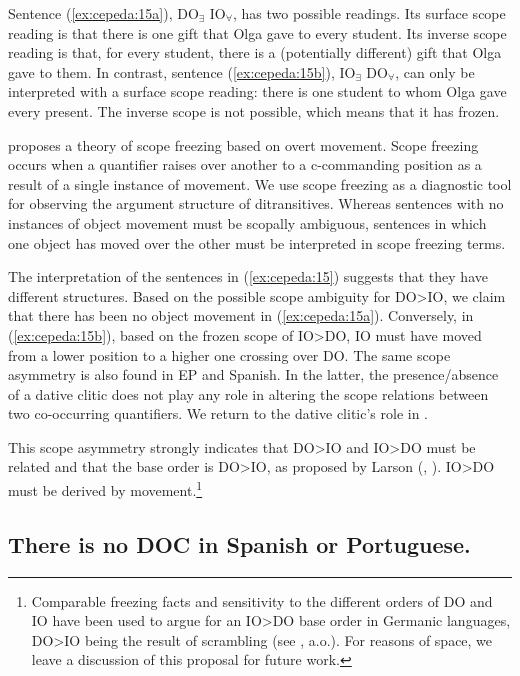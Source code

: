 \documentclass[output=paper,colorlinks,citecolor=brown,nonflat]{./langscibook}
\begin{document}
Sentence (\ref{ex:cepeda:15a}), DO$_∃$ IO$_∀$, has two possible readings. Its surface scope reading is that there is one gift that Olga gave to every student. Its inverse scope reading is that, for every student, there is a (potentially different) gift that Olga gave to them. In contrast, sentence (\ref{ex:cepeda:15b}), IO$_∃$  DO$_∀$, can only be interpreted with a surface scope reading: there is one student to whom Olga gave every present. The inverse scope is not possible, which means that it has frozen.

 proposes a theory of scope freezing based on overt movement. Scope freezing occurs when a quantifier raises over another to a c-commanding position as a result of a single instance of movement. We use scope freezing as a diagnostic tool for observing the argument structure of ditransitives. Whereas sentences with no instances of object movement must be scopally ambiguous, sentences in which one object has moved over the other must be interpreted in scope freezing terms.

The interpretation of the sentences in (\ref{ex:cepeda:15}) suggests that they have different structures. Based on the possible scope ambiguity for DO>IO, we claim that there has been no object movement in (\ref{ex:cepeda:15a}). Conversely, in (\ref{ex:cepeda:15b}), based on the frozen scope of IO>DO, IO must have moved from a lower position to a higher one crossing over DO. The same scope asymmetry is also found in EP and Spanish. In the latter, the presence/absence of a dative clitic does not play any role in altering the scope relations between two co-occurring quantifiers. We return to the dative clitic’s role in .

This scope asymmetry strongly indicates that DO>IO and IO>DO must be related and that the base order is DO>IO, as proposed by Larson (\citeyear{Larson1988}, \citeyear{Larson2014}). IO>DO must be derived by movement.\footnote{Comparable freezing facts and sensitivity to the different orders of DO and IO have been used to argue for an IO>DO base order in Germanic languages, DO>IO being the result of scrambling (see \citealt{Abraham1986, Choi1996, Bacovcin2017}, a.o.). For reasons of space, we leave a discussion of this proposal for future work.}

\subsection{There is no DOC in Spanish or Portuguese.}\label{sec:cepeda:2.2}
\end{document}
